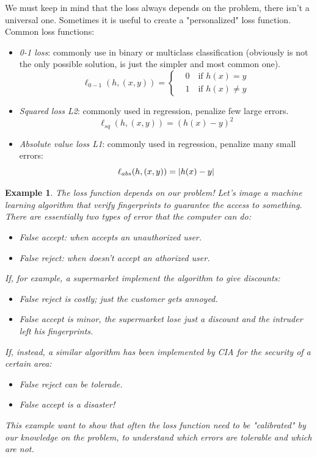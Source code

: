 \documentclass[12pt]{report}
\theoremstyle{plain}
\newtheorem{example}{Example}[chapter]
\begin{document}
\begin{flushleft}
We must keep in mind that the loss always depends on the problem, there isn't a universal one. Sometimes it is useful to create a "personalized" loss function.\\
Common loss functions:
\begin{itemize}
\item \textit{0-1 loss}: commonly use in binary or multiclass classification (obviously is not the only possible solution, is just the simpler and most common one).
\[ \ell_{0-1}(h,(x,y))=\left\{\begin{aligned} &0\quad\text{if  }h(x)=y\\ &1\quad\text{if  }h(x)\neq y\end{aligned}\right. \]
\item \textit{Squared loss L2}: commonly used in regression, penalize few large errors.
\[ \ell_{sq}(h,(x,y))=(h(x)-y)^2 \]
\item \textit{Absolute value loss L1}: commonly used in regression, penalize many small errors:
\[ \ell_{abs}(h,(x,y))=\abs{h(x)-y} \]
\end{itemize}

\begin{example} The loss function depends on our problem!
Let's image a machine learning algorithm that verify fingerprints to guarantee the access to something. There are essentially two types of error that the computer can do:
\begin{itemize}
\item \textit{False accept}: when accepts an unauthorized user.
\item \textit{False reject}: when doesn't accept an athorized user.
\end{itemize}
If, for example, a supermarket implement the algorithm to give discounts:
\begin{itemize}
\item[-] False reject is costly; just the customer gets annoyed.
\item[-] False accept is minor, the supermarket lose just a discount and the intruder left his fingerprints.
\end{itemize}
If, instead, a similar algorithm has been implemented by CIA for the security of a certain area:
\begin{itemize}
\item[-] False reject can be tolerade.
\item[-] False accept is a disaster!
\end{itemize}
This example want to show that often the loss function need to be "calibrated" by our knowledge on the problem, to understand which errors are tolerable and which are not.
\end{example}


\end{flushleft}
\end{document}
